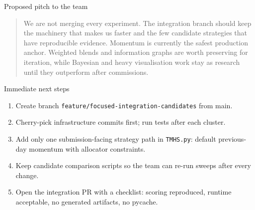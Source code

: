 \documentclass[aspectratio=169]{beamer}
\begin{document}
\begin{frame}{Proposed pitch to the team}
\begin{quote}
We are not merging every experiment. The integration branch should keep the machinery that makes us faster and the few candidate strategies that have reproducible evidence. Momentum is currently the safest production anchor. Weighted blends and information graphs are worth preserving for iteration, while Bayesian and heavy visualisation work stay as research until they outperform after commissions.
\end{quote}
\end{frame}

\begin{frame}{Immediate next steps}
\begin{enumerate}
  \item Create branch \texttt{feature/focused-integration-candidates} from main.
  \item Cherry-pick infrastructure commits first; run tests after each cluster.
  \item Add only one submission-facing strategy path in \texttt{TMHS.py}: default previous-day momentum with allocator constraints.
  \item Keep candidate comparison scripts so the team can re-run sweeps after every change.
  \item Open the integration PR with a checklist: scoring reproduced, runtime acceptable, no generated artifacts, no pycache.
\end{enumerate}
\end{frame}
\end{document}
